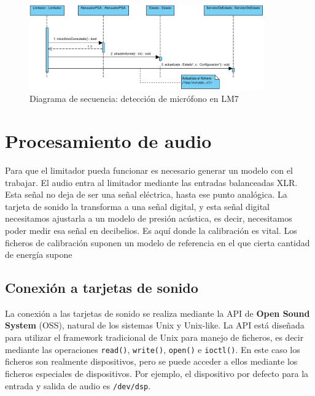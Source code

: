 \begin{figure}[h]
    \centering
    \includegraphics[width=0.9\textwidth]{figuras/lms7-mic-detection.pdf}
    \caption{Diagrama de secuencia: detección de micrófono en LM7}
    \label{fig:lm7-mic-detection}
\end{figure}

\clearpage
\section{Procesamiento de audio}

Para que el limitador pueda funcionar es necesario generar un modelo con el trabajar. El audio entra al limitador mediante las entradas balanceadas XLR. Esta señal no deja de ser una señal eléctrica, hasta ese punto analógica. La tarjeta de sonido la transforma a una señal digital, y esta señal digital necesitamos ajustarla a un modelo de presión acústica, es decir, necesitamos poder medir esa señal en decibelios. Es aquí donde la calibración es vital. Los ficheros de calibración suponen un modelo de referencia en el que cierta cantidad de energía supone

\subsection{Conexión a tarjetas de sonido}

La conexión a las tarjetas de sonido se realiza mediante la API de \textbf{Open Sound System} (OSS), natural de los sistemas Unix y Unix-like. La API está diseñada para utilizar el framework tradicional de Unix para manejo de ficheros, es decir mediante las operaciones \verb|read()|, \verb|write()|, \verb|open()| e \verb|ioctl()|. En este caso los ficheros son realmente dispositivos, pero se puede acceder a ellos mediante los ficheros especiales de dispositivos. Por ejemplo, el dispositivo por defecto para la entrada y salida de audio es \verb|/dev/dsp|. \\

